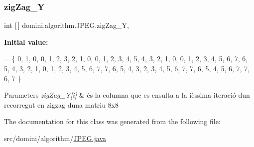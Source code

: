 \subsubsection{\texorpdfstring{zig\+Zag\+\_\+Y}{zigZag\_Y}}
{\footnotesize\ttfamily int \mbox{[}$\,$\mbox{]} domini.\+algorithm.\+J\+P\+E\+G.\+zig\+Zag\+\_\+Y\hspace{0.3cm}{\ttfamily [static]}, {\ttfamily [private]}}

{\bfseries Initial value\+:}
\begin{DoxyCode}
= \{
        0,
        1, 0,
        0, 1, 2,
        3, 2, 1, 0,
        0, 1, 2, 3, 4,
        5, 4, 3, 2, 1, 0,
        0, 1, 2, 3, 4, 5, 6,
        7, 6, 5, 4, 3, 2, 1, 0,
        1, 2, 3, 4, 5, 6, 7,
        7, 6, 5, 4, 3, 2,
        3, 4, 5, 6, 7,
        7, 6, 5, 4,
        5, 6, 7,
        7, 6,
        7
    \}
\end{DoxyCode}

\begin{DoxyParams}{Parameters}
{\em zig\+Zag\+\_\+\+Y\mbox{[}i\mbox{]}} & és la columna que es cnsulta a la ièssima iteració d\textquotesingle{}un recorregut en zigzag d\textquotesingle{}una matriu 8x8 \\
\hline
\end{DoxyParams}


The documentation for this class was generated from the following file\+:\begin{DoxyCompactItemize}
\item 
src/domini/algorithm/\hyperlink{JPEG_8java}{J\+P\+E\+G.\+java}\end{DoxyCompactItemize}

